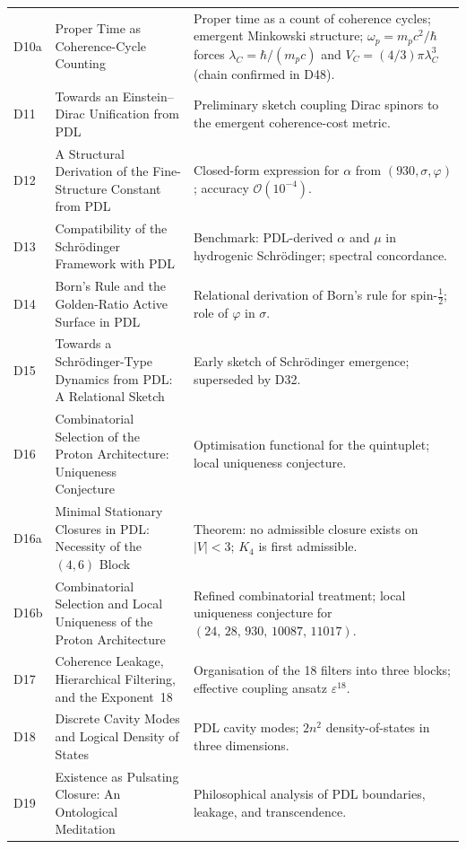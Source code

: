 \documentclass[11pt,a4paper]{article}
\theoremstyle{plain}
\theoremstyle{definition}
\theoremstyle{remark}
\newcommand{\quintuplet}{(24,\,28,\,930,\,10087,\,11017)}
\begin{document}
\begin{longtable}{L{1.3cm}L{3.8cm}L{8.0cm}}
D10a & Proper Time as Coherence-Cycle Counting~\cite{D10a} & Proper time as a count of coherence cycles; emergent Minkowski structure; $\omega_p = m_p c^2/\hbar$ forces $\lambda_C = \hbar/(m_p c)$ and $V_C = (4/3)\pi\lambda_C^3$ (chain confirmed in D48).\\[0.3em]
D11 & Towards an Einstein--Dirac Unification from PDL~\cite{D11} & Preliminary sketch coupling Dirac spinors to the emergent coherence-cost metric.\\[0.3em]
D12 & A Structural Derivation of the Fine-Structure Constant from PDL~\cite{D12} & Closed-form expression for $\alpha$ from $(930, \sigma, \varphi)$; accuracy $\mathcal{O}(10^{-4})$.\\[0.3em]
D13 & Compatibility of the Schr\"odinger Framework with PDL~\cite{D13} & Benchmark: PDL-derived $\alpha$ and $\mu$ in hydrogenic Schr\"odinger; spectral concordance.\\[0.3em]
D14 & Born's Rule and the Golden-Ratio Active Surface in PDL~\cite{D14} & Relational derivation of Born's rule for spin-$\tfrac{1}{2}$; role of $\varphi$ in $\sigma$.\\[0.3em]
D15 & Towards a Schr\"odinger-Type Dynamics from PDL: A Relational Sketch~\cite{D15} & Early sketch of Schr\"odinger emergence; superseded by D32.\\[0.3em]
D16 & Combinatorial Selection of the Proton Architecture: Uniqueness Conjecture~\cite{D16} & Optimisation functional for the quintuplet; local uniqueness conjecture.\\[0.3em]
D16a & Minimal Stationary Closures in PDL: Necessity of the $(4,6)$ Block~\cite{D16a} & \textcolor{proofblue}{Theorem}: no admissible closure exists on $|V|<3$; $K_4$ is first admissible.\\[0.3em]
D16b & Combinatorial Selection and Local Uniqueness of the Proton Architecture~\cite{D16b} & Refined combinatorial treatment; local uniqueness conjecture for $\quintuplet$.\\[0.3em]
D17 & Coherence Leakage, Hierarchical Filtering, and the Exponent~18~\cite{D17} & Organisation of the 18 filters into three blocks; effective coupling ansatz $\varepsilon^{18}$.\\[0.3em]
D18 & Discrete Cavity Modes and Logical Density of States~\cite{D18} & PDL cavity modes; $2n^2$ density-of-states in three dimensions.\\[0.3em]
D19 & Existence as Pulsating Closure: An Ontological Meditation~\cite{D19} & Philosophical analysis of PDL boundaries, leakage, and transcendence.\\[0.3em]

\end{longtable}
\end{document}
